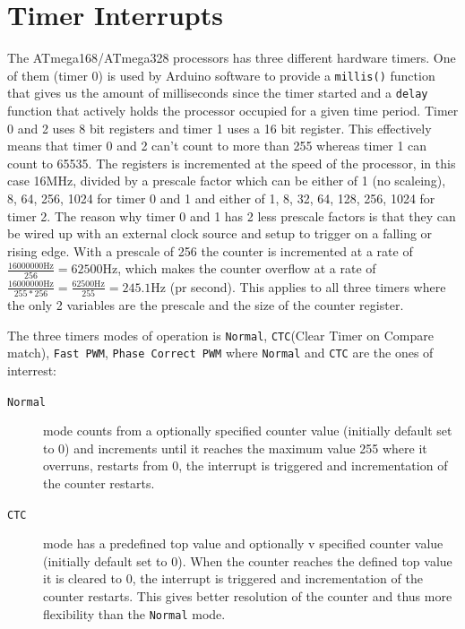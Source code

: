\documentclass[a4paper, oneside, final]{memoir}
\begin{document}
\section{Timer Interrupts}
\label{sec:timer-interrupts}

The ATmega168/ATmega328 processors has three different hardware
timers. One of them (timer 0) is used by Arduino software to provide a
\texttt{millis()} function that gives us the amount of milliseconds
since the timer started and a \texttt{delay} function that actively
holds the processor occupied for a given time period. Timer 0 and 2
uses 8 bit registers and timer 1 uses a 16 bit register. This
effectively means that timer 0 and 2 can't count to more than 255
whereas timer 1 can count to 65535. The registers is incremented at
the speed of the processor, in this case 16MHz, divided by a prescale
factor which can be either of 1 (no scaleing), 8, 64, 256, 1024 for
timer 0 and 1 and either of 1, 8, 32, 64, 128, 256, 1024 for timer
2. The reason why timer 0 and 1 has 2 less prescale factors is that
they can be wired up with an external clock source and setup to
trigger on a falling or rising edge. With a prescale of 256 the
counter is incremented at a rate of $\frac{16000000\mathrm{Hz}}{256} =
62500\mathrm{Hz}$, which makes the counter overflow at a rate of
$\frac{16000000\mathrm{Hz}}{255*256} = \frac{62500\mathrm{Hz}}{255} =
245.1\mathrm{Hz}$ (pr second). This applies to all three timers where the only
2 variables are the prescale and the size of the counter register.

The three timers modes of operation is \texttt{Normal},
\texttt{CTC}(Clear Timer on Compare match), \texttt{Fast PWM},
\texttt{Phase Correct PWM} where \texttt{Normal} and \texttt{CTC} are
the ones of interrest:

\begin{description}
\item[\texttt{Normal}] mode counts from a optionally specified counter
  value (initially default set to 0) and increments until it reaches
  the maximum value 255 where it overruns, restarts from 0, the
  interrupt is triggered and incrementation of the counter
  restarts.

\item[\texttt{CTC}] mode has a predefined top value and optionally
v  specified counter value (initially default set to 0). When the
  counter reaches the defined top value it is cleared to 0, the
  interrupt is triggered and incrementation of the counter
  restarts. This gives better resolution of the counter and thus more
  flexibility than the \texttt{Normal} mode.
\end{description}
\end{document}
